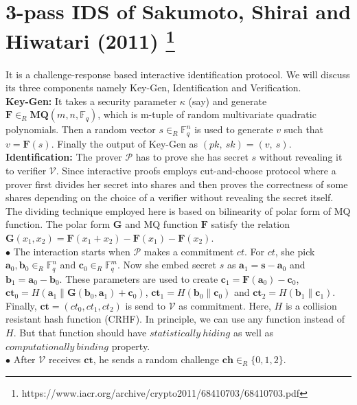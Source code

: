 \documentclass{article}
\begin{document}
\section*{3-pass IDS of Sakumoto, Shirai and Hiwatari (2011) \footnote{https://www.iacr.org/archive/crypto2011/68410703/68410703.pdf}}
It is a challenge-response based interactive identification protocol. We will discuss its three components namely Key-Gen, Identification and Verification.\\
\textbf{Key-Gen:} It takes a security parameter $\kappa$ (say) and generate $\textbf{F} \in_R \textbf{MQ}(m,n,\mathbb{F}_q)$, which is m-tuple of random multivariate quadratic polynomials. Then a random vector $s \in_R \mathbb{F}^n _q$ is used to generate $v$ such that  $v = \textbf{F}(s)$. Finally the output of Key-Gen as $(pk,\ sk) = (v,\ s)$.\\
\textbf{Identification:} The prover $\mathcal{P}$ has to prove she has secret $s$ without revealing it to verifier $\mathcal{V}$. Since interactive proofs employs cut-and-choose protocol where a prover first divides her secret into shares and then proves the correctness of some shares depending on the choice of a verifier without revealing the secret itself. The dividing technique employed here is based on bilinearity of polar form of MQ function. The polar form $\textbf{G}$ and MQ function $\textbf{F}$ satisfy the relation $ \textbf{G}(x_1,x_2) = \textbf{F}(x_1 + x_2) -\textbf{F}(x_1)-\textbf{F}(x_2)$.\\
$\bullet$ The interaction starts when $\mathcal{P}$ makes a commitment $ct$. For $ct$, she pick $\textbf{a}_0, \textbf{b}_0 \in_R \mathbb{F}^n _q$ and $\textbf{c}_0 \in_R \mathbb{F}^m _q$. Now she embed secret $s$ as $\textbf{a}_1 =\textbf{s}-\textbf{a}_0$ and $\textbf{b}_1 = \textbf{a}_0 - \textbf{b}_0$. These parameters are used to create $\textbf{c}_1 = \textbf{F}(\textbf{a}_0)-\textbf{c}_0$, $\textbf{ct}_0 = H(\textbf{a}_1 \parallel \textbf{G}(\textbf{b}_0, \textbf{a}_1) + \textbf{c}_0)$, $\textbf{ct}_1 = H(\textbf{b}_0\parallel \textbf{c}_0)$ and $\textbf{ct}_2 = H(\textbf{b}_1\parallel \textbf{c}_1)$. Finally, $\textbf{ct} = (ct_0, ct_1, ct_2)$ is send to $\mathcal{V}$ as commitment. Here, $H$ is a collision resistant hash function (CRHF). In principle, we can use any function instead of $H$. But that function should have $statistically\ hiding$ as well as $computationally\ binding$ property.\\
$\bullet$ After $\mathcal{V}$ receives $\textbf{ct}$, he sends a random challenge $\textbf{ch} \in_R \{0,1,2\}$.\\
\end{document}
